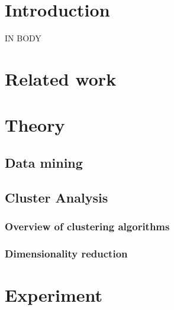 \section{Introduction}
\label{section:Introduction}
IN BODY




\section{Related work}
\label{section:RelatedWork}




\section{Theory}
\label{section:Theory}


  \subsection{Data mining}
  \label{section:TheoryDataMining}
  

  \subsection{Cluster Analysis}
  \label{section:TheoryClusterAnalysis}
  

    \subsubsection{Overview of clustering algorithms}
    \label{section:TheoryOverviewClusteringAlgorithms}
    

    \subsubsection{Dimensionality reduction}
    \label{section:TheoryDimensionalityReduction}
    



\section{Experiment}
\label{section:Experiment}


